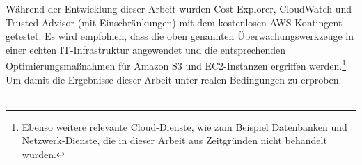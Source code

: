 Während der Entwicklung dieser Arbeit wurden Cost-Explorer, CloudWatch und Trusted Advisor (mit Einschränkungen) mit dem kostenlosen AWS-Kontingent getestet. Es wird empfohlen, dass die oben genannten Überwachungswerkzeuge in einer echten IT-Infrastruktur angewendet und die entsprechenden Optimierungsmaßnahmen für Amazon S3 und EC2-Instanzen ergriffen werden.\footnote{Ebenso weitere relevante Cloud-Dienste, wie zum Beispiel Datenbanken und Netzwerk-Dienste, die in dieser Arbeit aus Zeitgründen nicht behandelt wurden.} Um damit die Ergebnisse dieser Arbeit unter realen Bedingungen zu erproben. %
\\\\
